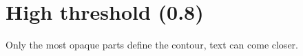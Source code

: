 \documentclass{article}
\begin{document}
\section*{High threshold (0.8)}

Only the most opaque parts define the contour,
text can come closer.

\lipsum[1-5]
\end{document}
